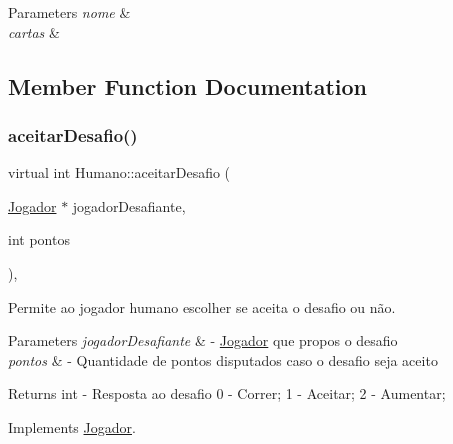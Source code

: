 \begin{DoxyParams}{Parameters}
{\em nome} & \\
\hline
{\em cartas} & \\
\hline
\end{DoxyParams}


\subsection{Member Function Documentation}
\mbox{\label{class_humano_aa1cd4b8c801b73190ad1472f6fc860b1}} 
\subsubsection{\texorpdfstring{aceitarDesafio()}{aceitarDesafio()}}
{\footnotesize\ttfamily virtual int Humano\+::aceitar\+Desafio (\begin{DoxyParamCaption}\item[{\mbox{\hyperlink{class_jogador}{Jogador}} $\ast$}]{jogador\+Desafiante,  }\item[{int}]{pontos }\end{DoxyParamCaption})\hspace{0.3cm}{\ttfamily [override]}, {\ttfamily [virtual]}}



Permite ao jogador humano escolher se aceita o desafio ou não. 


\begin{DoxyParams}{Parameters}
{\em jogador\+Desafiante} & -\/ \mbox{\hyperlink{class_jogador}{Jogador}} que propos o desafio \\
\hline
{\em pontos} & -\/ Quantidade de pontos disputados caso o desafio seja aceito \\
\hline
\end{DoxyParams}
\begin{DoxyReturn}{Returns}
int -\/ Resposta ao desafio 0 -\/ Correr; 1 -\/ Aceitar; 2 -\/ Aumentar; 
\end{DoxyReturn}


Implements \mbox{\hyperlink{class_jogador_a4eceb45cff559f97cd441da30d36769c}{Jogador}}.

\mbox{\label{class_humano_a44adc47b7acc857f0614c82e53a7759f}} 
